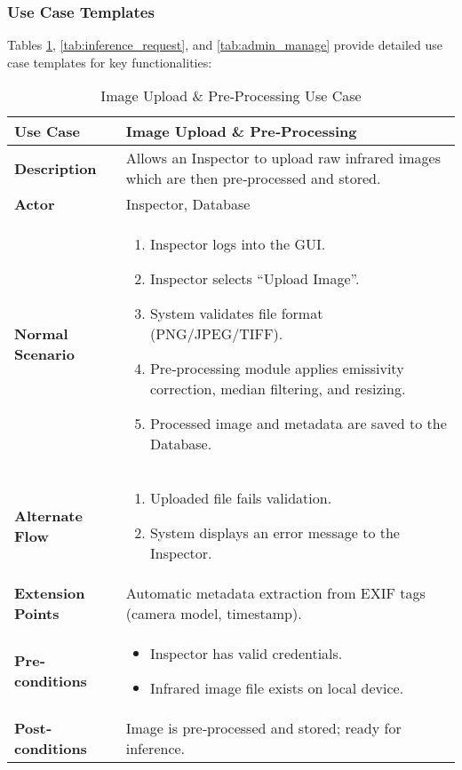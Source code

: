 \subsubsection{Use Case Templates}

Tables \ref{tab:image_upload}, \ref{tab:inference_request}, and \ref{tab:admin_manage} provide detailed use case templates for key functionalities:

\begin{table}[h!]
    \centering
    \fontsize{10}{12}\selectfont
    \caption{Image Upload \& Pre‐Processing Use Case}
    \label{tab:image_upload}
    \begin{tabular}{|l|p{10cm}|}
        \hline
        \textbf{Use Case}         & Image Upload \& Pre‐Processing                                        \\ \hline
        \textbf{Description}      & Allows an Inspector to upload raw infrared images which are then pre‐processed and stored. \\ \hline
        \textbf{Actor}            & Inspector, Database                                                   \\ \hline
        \textbf{Normal Scenario}  &
        \begin{enumerate}
            \item Inspector logs into the GUI.
            \item Inspector selects “Upload Image”.
            \item System validates file format (PNG/JPEG/TIFF).
            \item Pre‐processing module applies emissivity correction, median filtering, and resizing.
            \item Processed image and metadata are saved to the Database.
        \end{enumerate}                                                      \\ \hline
        \textbf{Alternate Flow}   &
        \begin{enumerate}
            \item Uploaded file fails validation.
            \item System displays an error message to the Inspector.
        \end{enumerate}                                                      \\ \hline
        \textbf{Extension Points} & Automatic metadata extraction from EXIF tags (camera model, timestamp). \\ \hline
        \textbf{Pre‐conditions}   &
        \begin{itemize}
            \item Inspector has valid credentials.
            \item Infrared image file exists on local device.
        \end{itemize}                                                         \\ \hline
        \textbf{Post‐conditions}  & Image is pre‐processed and stored; ready for inference.               \\ \hline
    \end{tabular}
\end{table}

